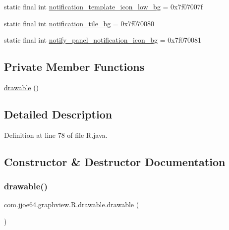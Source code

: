 \begin{DoxyCompactItemize}
\item 
static final int \mbox{\hyperlink{classcom_1_1jjoe64_1_1graphview_1_1_r_1_1drawable_a695e981d0ca586f4b19443e416da8f5d}{notification\+\_\+template\+\_\+icon\+\_\+low\+\_\+bg}} = 0x7f07007f
\item 
static final int \mbox{\hyperlink{classcom_1_1jjoe64_1_1graphview_1_1_r_1_1drawable_a1a7e77810cb6cf6c149d3fd56153c240}{notification\+\_\+tile\+\_\+bg}} = 0x7f070080
\item 
static final int \mbox{\hyperlink{classcom_1_1jjoe64_1_1graphview_1_1_r_1_1drawable_a6717bfdb0e1cb8bc4d33a72cf8b68b6e}{notify\+\_\+panel\+\_\+notification\+\_\+icon\+\_\+bg}} = 0x7f070081
\end{DoxyCompactItemize}
\subsection*{Private Member Functions}
\begin{DoxyCompactItemize}
\item 
\mbox{\hyperlink{classcom_1_1jjoe64_1_1graphview_1_1_r_1_1drawable_aceb9665eb7b2eefbdb7de2364c57cf36}{drawable}} ()
\end{DoxyCompactItemize}


\subsection{Detailed Description}


Definition at line 78 of file R.\+java.



\subsection{Constructor \& Destructor Documentation}
\mbox{\label{classcom_1_1jjoe64_1_1graphview_1_1_r_1_1drawable_aceb9665eb7b2eefbdb7de2364c57cf36}} 
\subsubsection{\texorpdfstring{drawable()}{drawable()}}
{\footnotesize\ttfamily com.\+jjoe64.\+graphview.\+R.\+drawable.\+drawable (\begin{DoxyParamCaption}{ }\end{DoxyParamCaption})\hspace{0.3cm}{\ttfamily [private]}}



